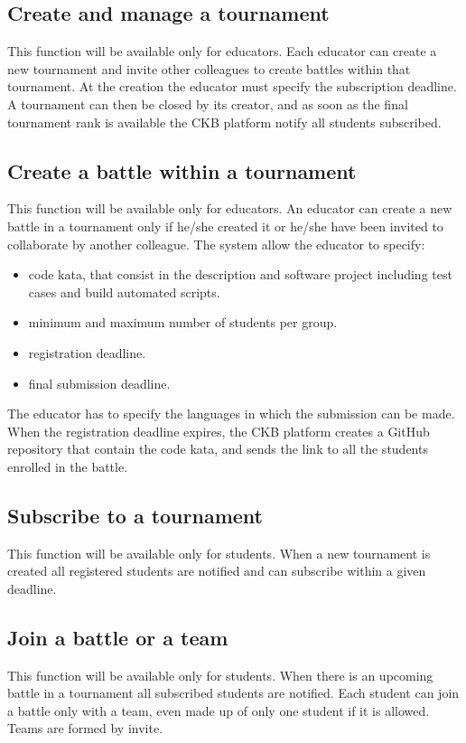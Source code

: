 \subsection{Create and manage a tournament}
This function will be available only for educators. \newline
Each educator can create a new tournament and invite other colleagues to create battles within that tournament. At the creation the educator must specify the subscription deadline. 
A tournament can then be closed by its creator, and as soon as the final tournament rank is available the CKB platform notify all students subscribed.

\subsection{Create a battle within a tournament}
This function will be available only for educators. \newline 
An educator can create a new battle in a tournament only if he/she created it or he/she have been invited to collaborate by another colleague.
The system allow the educator to specify: 
\begin{itemize}
    \item code kata, that consist in the description and software project including test cases and build automated scripts.
    \item minimum and maximum number of students per group.
    \item registration deadline.
    \item final submission deadline.
\end{itemize}
The educator has to specify the languages in which the submission can be made.
When the registration deadline expires, the CKB platform creates a GitHub repository that contain the code kata, and sends the link to all the students enrolled in the battle.

\subsection{Subscribe to a tournament}
This function will be available only for students. \newline When a new tournament is created all registered students are notified and can subscribe within a given deadline.

\subsection{Join a battle or a team}
This function will be available only for students. \newline When there is an upcoming battle in a tournament all subscribed students are notified. Each student can join a battle only with a team, even made up of only one student if it is allowed. Teams are formed by invite.

